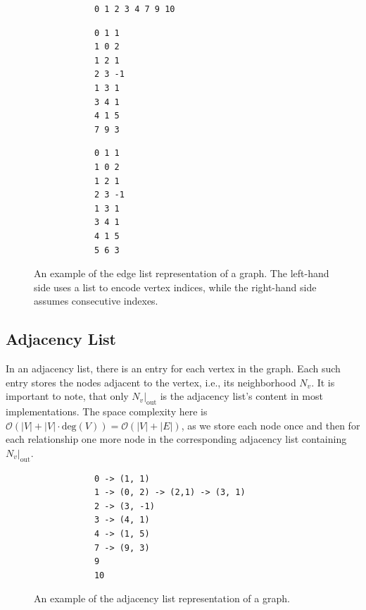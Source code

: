             \begin{figure}[htp]
            \begin{center}
            \begin{minipage}{0.5\textwidth}
            \begin{verbatim}
            0 1 2 3 4 7 9 10
            \end{verbatim}
            \begin{verbatim}
            0 1 1
            1 0 2
            1 2 1
            2 3 -1
            1 3 1
            3 4 1
            4 1 5
            7 9 3
            \end{verbatim}
            \end{minipage}%
            \hfill%
            \begin{minipage}{0.5\textwidth}
            \begin{verbatim}
            0 1 1
            1 0 2
            1 2 1
            2 3 -1
            1 3 1
            3 4 1
            4 1 5
            5 6 3
            \end{verbatim}
            \end{minipage}
            \end{center}
            \caption{%
                An example of the edge list representation of a graph.%
                The left-hand side uses a list to encode vertex indices, while the right-hand side assumes consecutive indexes.%
            }
            \label{edgelist}
            \end{figure}
        
        \subsection{Adjacency List}
        In an adjacency list, there is an entry for each vertex in the graph. 
        Each such entry stores the nodes adjacent to the vertex, i.e., its neighborhood $N_v$. 
        It is important to note, that only $N_v |_\text{out}$ is the adjacency list's content in most implementations.
        The space complexity here is $\mathcal{O}(|V| + |V| \cdot \text{deg}(V)) = \mathcal{O}(|V| + |E|)$, as we store each node once and then for each relationship one more node in the corresponding adjacency list containing $N_v |_\text{out}$.

        \begin{figure}[htp]
         \begin{center}
          \begin{verbatim}
            0 -> (1, 1)
            1 -> (0, 2) -> (2,1) -> (3, 1)
            2 -> (3, -1)
            3 -> (4, 1)
            4 -> (1, 5)
            7 -> (9, 3)
            9
            10
          \end{verbatim}
         \end{center}
         \caption{An example of the adjacency list representation of a graph.}
         \label{adjl}
        \end{figure}
        
